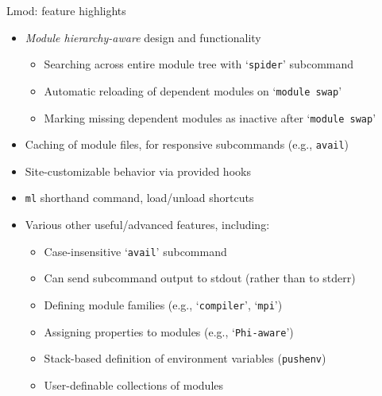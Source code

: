 \documentclass[10pt,xcolor={usenames,dvipsnames}]{beamer}
\begin{document}
\begin{frame}{Lmod: feature highlights}
\begin{itemize}
    \item
        \emph{Module hierarchy-aware} design and functionality
    \begin{itemize}
        \item
            Searching across entire module tree with `\texttt{spider}' subcommand
        \item
            Automatic reloading of dependent modules on `\texttt{module swap}'
        \item
            Marking missing dependent modules as inactive after `\texttt{module swap}'
    \end{itemize}
    \item
        Caching of module files, for responsive subcommands
        (e.g., \texttt{avail})
    \item
        Site-customizable behavior via provided hooks
    \item
        \texttt{ml} shorthand command, load/unload shortcuts
    \item
        Various other useful/advanced features, including:
    \begin{itemize}
        \item
            Case-insensitive `\texttt{avail}' subcommand
        \item
            Can send subcommand output to stdout (rather than to stderr)
        \item
            Defining module families (e.g., `\texttt{compiler}', `\texttt{mpi}')
        \item
            Assigning properties to modules (e.g., `\texttt{Phi-aware}')
        \item
            Stack-based definition of environment variables (\texttt{pushenv})
        \item
            User-definable collections of modules
    \end{itemize}
\end{itemize}
\end{frame}

\end{document}
